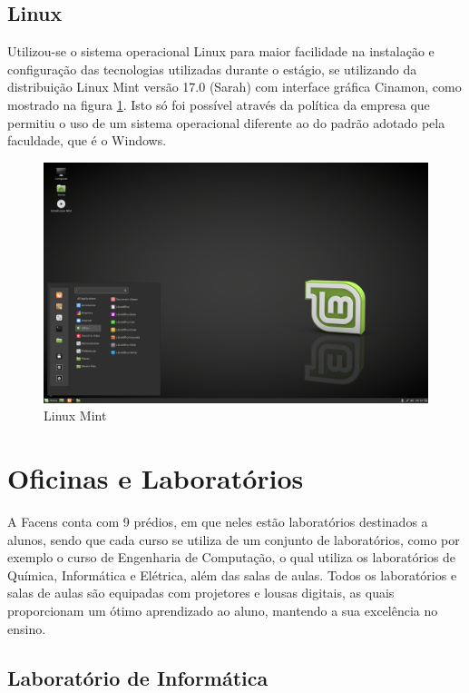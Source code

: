 \documentclass[
	12pt,				%
	oneside,			%
	a4paper,			%
	chapter=TITLE,		%
	section=TITLE,		%
	sumario=tradicional %
	english,			%
	french,				%
	spanish,			%
	brazil				%
	]{abntex2}
\begin{document}
\subsection{Linux}
Utilizou-se o sistema operacional Linux para maior facilidade na instalação e configuração das tecnologias utilizadas durante o estágio, se utilizando da distribuição Linux Mint versão 17.0 (Sarah) com interface gráfica Cinamon, como mostrado na figura \ref{fig:linux}. Isto só foi possível através da política da empresa que permitiu o uso de um sistema operacional diferente ao do padrão adotado pela faculdade, que é o Windows.

\begin{figure}[htb]
	\caption{\label{fig:linux} Linux Mint}
	\begin{center}
		\includegraphics[scale=0.3]{linux}
	\end{center}
\end{figure}


\section{Oficinas e Laboratórios}
\label{sec:oficlabs}
A Facens conta com 9 prédios, em que neles estão laboratórios destinados a alunos, sendo que cada curso se utiliza de um conjunto de laboratórios, como por exemplo o curso de Engenharia de Computação, o qual utiliza os laboratórios de Química, Informática e Elétrica, além das salas de aulas. Todos os laboratórios e salas de aulas são equipadas com projetores e lousas digitais, as quais proporcionam um ótimo aprendizado ao aluno, mantendo a sua excelência no ensino.

\subsection{Laboratório de Informática}
\end{document}
